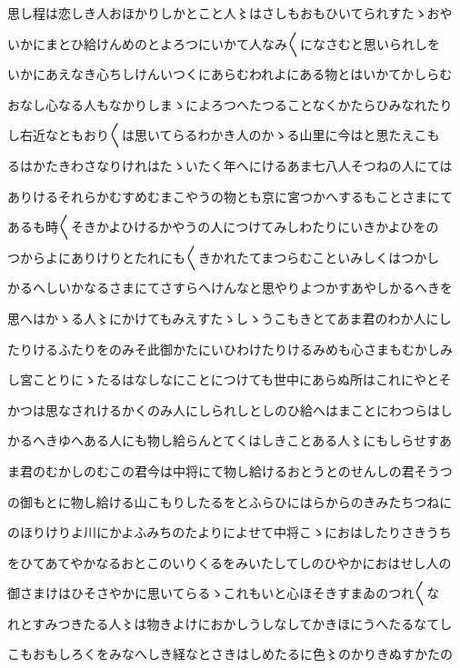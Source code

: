 \documentclass[a4paper,11pt,landscape]{ltjtarticle}
\begin{document}
思し程は恋しき人おほかりしかとこと人〻はさしもおもひいてられすたゝおや
\par\medskip
いかにまとひ給けんめのとよろつにいかて人なみ〱になさむと思いられしを
\par\medskip
いかにあえなき心ちしけんいつくにあらむわれよにある物とはいかてかしらむ
\par\medskip
おなし心なる人もなかりしまゝによろつへたつることなくかたらひみなれたり
\par\medskip
し右近なともおり〱は思いてらるわかき人のかゝる山里に今はと思たえこも
\par\medskip
るはかたきわさなりけれはたゝいたく年へにけるあま七八人そつねの人にては
\par\medskip
ありけるそれらかむすめむまこやうの物とも京に宮つかへするもことさまにて
\par\medskip
あるも時〱そきかよひけるかやうの人につけてみしわたりにいきかよひをの
\par\medskip
つからよにありけりとたれにも〱きかれたてまつらむこといみしくはつかし
\par\medskip
かるへしいかなるさまにてさすらへけんなと思やりよつかすあやしかるへきを
\par\medskip
思へはかゝる人〻にかけてもみえすたゝしゝうこもきとてあま君のわか人にし
\par\medskip
たりけるふたりをのみそ此御かたにいひわけたりけるみめも心さまもむかしみ
\par\medskip
し宮ことりにゝたるはなしなにことにつけても世中にあらぬ所はこれにやとそ
\par\medskip
かつは思なされけるかくのみ人にしられしとしのひ給へはまことにわつらはし
\par\medskip
かるへきゆへある人にも物し給らんとてくはしきことある人〻にもしらせすあ
\par\medskip
ま君のむかしのむこの君今は中将にて物し給けるおとうとのせんしの君そうつ
\par\medskip
の御もとに物し給ける山こもりしたるをとふらひにはらからのきみたちつねに
\par\medskip
のほりけりよ川にかよふみちのたよりによせて中将こゝにおはしたりさきうち
\par\medskip
をひてあてやかなるおとこのいりくるをみいたしてしのひやかにおはせし人の
\par\medskip
御さまけはひそさやかに思いてらるゝこれもいと心ほそきすまゐのつれ〱な
\par\medskip
れとすみつきたる人〻は物きよけにおかしうしなしてかきほにうへたるなてし
\par\medskip
こもおもしろくをみなへしき経なとさきはしめたるに色〻のかりきぬすかたの
\end{document}
